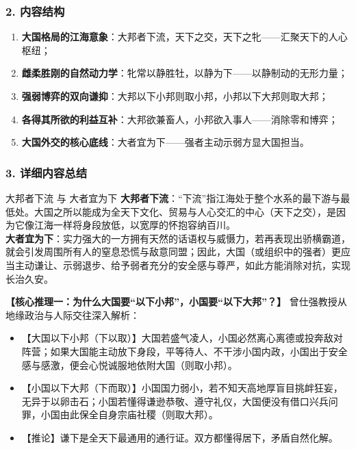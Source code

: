 \subsubsection{2. 内容结构}
\begin{enumerate}
    \item \textbf{大国格局的江海意象}：大邦者下流，天下之交，天下之牝——汇聚天下的人心枢纽；
    \item \textbf{雌柔胜刚的自然动力学}：牝常以静胜牡，以静为下——以静制动的无形力量；
    \item \textbf{强弱博弈的双向谦抑}：大邦以下小邦则取小邦，小邦以下大邦则取大邦；
    \item \textbf{各得其所欲的利益互补}：大邦欲兼畜人，小邦欲入事人——消除零和博弈；
    \item \textbf{大国外交的核心底线}：大者宜为下——强者主动示弱方显大国担当。
\end{enumerate}

\subsubsection{3. 详细内容总结}

\begin{ConceptBox}{大邦者下流 与 大者宜为下}
\textbf{大邦者下流}：“下流”指江海处于整个水系的最下游与最低处。大国之所以能成为全天下文化、贸易与人心交汇的中心（天下之交），是因为它像江海一样将身段放低，以宽厚的怀抱容纳百川。\\
\textbf{大者宜为下}：实力强大的一方拥有天然的话语权与威慑力，若再表现出骄横霸道，就会引发周围所有人的窒息恐慌与敌意同盟；因此，大国（或组织中的强者）更应当主动谦让、示弱退步、给予弱者充分的安全感与尊严，如此方能消除对抗，实现长治久安。
\end{ConceptBox}

\noindent\textbf{【核心推理一：为什么大国要“以下小邦”，小国要“以下大邦”？】}
曾仕强教授从地缘政治与人际交往深入解析：
\begin{itemize}
    \item 【大国以下小邦（下以取）】大国若盛气凌人，小国必然离心离德或投奔敌对阵营；如果大国能主动放下身段，平等待人、不干涉小国内政，小国出于安全感与感激，便会心悦诚服地依附大国（则取小邦）。
    \item 【小国以下大邦（下而取）】小国国力弱小，若不知天高地厚盲目挑衅狂妄，无异于以卵击石；小国若懂得谦逊恭敬、遵守礼仪，大国便没有借口兴兵问罪，小国由此保全自身宗庙社稷（则取大邦）。
    \item 【推论】谦下是全天下最通用的通行证。双方都懂得居下，矛盾自然化解。
\end{itemize}

